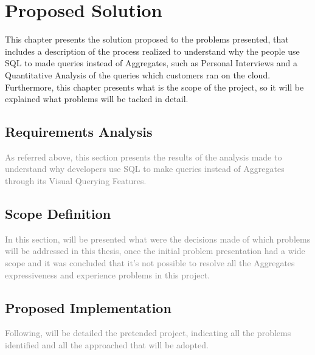 \chapter{Proposed Solution}
\label{cha:proposed_solution}
This chapter presents the solution proposed to the problems presented, that includes a description of the process realized to understand why the people use SQL to made queries instead of Aggregates, such as Personal Interviews and a Quantitative Analysis of the queries which customers ran on the cloud. Furthermore, this chapter presents what is the scope of the project, so it will be explained what problems will be tacked in detail.

\section{Requirements Analysis}
\label{sec:requirements_analysis}
\textcolor{gray}{As referred above, this section presents the results of the analysis made to understand why developers use SQL to make queries instead of Aggregates through its Visual Querying Features.}

\section{Scope Definition}
\label{sec:scope_definition}
\textcolor{gray}{In this section, will be presented what were the decisions made of which problems will be addressed in this thesis, once the initial problem presentation had a wide scope and it was concluded that it's not possible to resolve all the Aggregates expressiveness and experience problems in this project.}

\section{Proposed Implementation}
\label{sec:proposed_implementation}
\textcolor{gray}{Following, will be detailed the pretended project, indicating all the problems identified and all the approached that will be adopted.}